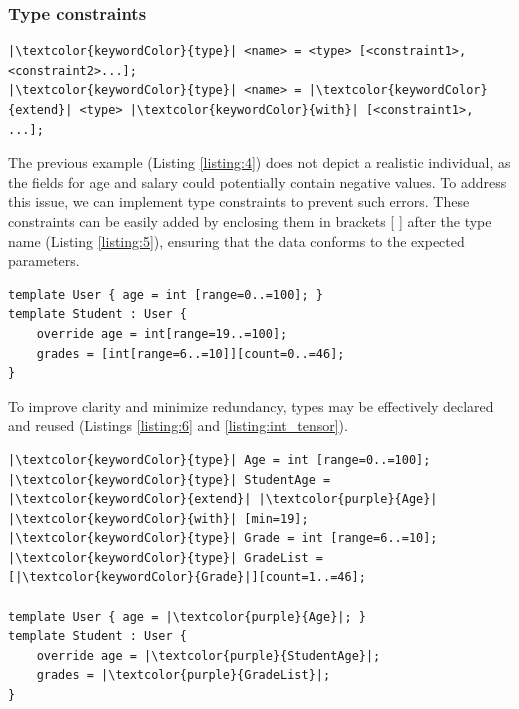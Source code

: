 \documentclass[11pt,a4paper]{article}
\begin{document}
    \subsubsection{Type constraints}
    \begin{listing}[h]
        \begin{verbatim}
|\textcolor{keywordColor}{type}| <name> = <type> [<constraint1>, <constraint2>...];
|\textcolor{keywordColor}{type}| <name> = |\textcolor{keywordColor}{extend}| <type> |\textcolor{keywordColor}{with}| [<constraint1>, ...];
        \end{verbatim}
        \caption{Constrained type declaration}
        \label{declaration:type_constraint}
    \end{listing}

    \par The previous example (Listing \ref{listing:4}) does not depict a realistic individual, as the fields for age 
    and salary could potentially contain negative values. To address this issue, we can implement type constraints to prevent such errors. 
    These constraints can be easily added by enclosing them in brackets [ ] after the type name (Listing \ref{listing:5}), ensuring that the data 
    conforms to the expected parameters.
    \begin{listing}[h]
        \begin{verbatim}
template User { age = int [range=0..=100]; }
template Student : User { 
    override age = int[range=19..=100];
    grades = [int[range=6..=10]][count=0..=46]; 
}
        \end{verbatim}
        \caption{Templates with constrained data types}
        \centering
        \label{listing:5}
    \end{listing}
    \par To improve clarity and minimize redundancy, types may be effectively declared and reused (Listings \ref{listing:6} and \ref{listing:int_tensor}). 
    \begin{listing}[h]
    \begin{verbatim}
|\textcolor{keywordColor}{type}| Age = int [range=0..=100];
|\textcolor{keywordColor}{type}| StudentAge = |\textcolor{keywordColor}{extend}| |\textcolor{purple}{Age}| |\textcolor{keywordColor}{with}| [min=19];
|\textcolor{keywordColor}{type}| Grade = int [range=6..=10];
|\textcolor{keywordColor}{type}| GradeList = [|\textcolor{keywordColor}{Grade}|][count=1..=46];

template User { age = |\textcolor{purple}{Age}|; }
template Student : User { 
    override age = |\textcolor{purple}{StudentAge}|;
    grades = |\textcolor{purple}{GradeList}|; 
}
        \end{verbatim}
        \caption{Templates with user-defined data types}
        \centering
        \label{listing:6}
    \end{listing}
    \pagebreak
\end{document}
